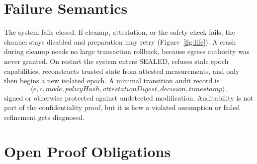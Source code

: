 \documentclass[11pt,letterpaper]{article}
\theoremstyle{plain}
\theoremstyle{definition}
\begin{document}
\section{Failure Semantics}\label{sec:failure}

The system fails closed. If cleanup, attestation, or the safety check fails, the channel stays disabled and preparation may retry (Figure~\ref{fig:life}). A crash during cleanup needs no large transaction rollback, because egress authority was never granted. On restart the system enters SEALED, refuses stale epoch capabilities, reconstructs trusted state from attested measurements, and only then begins a new isolated epoch. A minimal transition audit record is
\begin{equation}
\langle e, c, \mathit{mode}, \mathit{policyHash}, \mathit{attestationDigest}, \mathit{decision}, \mathit{timestamp}\rangle,
\end{equation}
signed or otherwise protected against undetected modification. Auditability is not part of the confidentiality proof, but it is how a violated assumption or failed refinement gets diagnosed.

\section{Open Proof Obligations}\label{sec:obligations}
\end{document}
